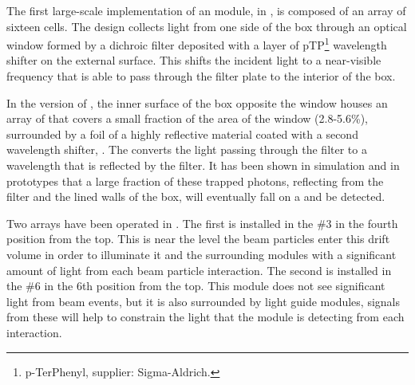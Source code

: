 The first large-scale implementation of an  module, in , is composed of an array of sixteen cells.
The  design collects light from one side of the box through an optical window formed by a dichroic filter deposited with a layer of pTP\footnote{p-TerPhenyl, supplier: Sigma-Aldrich\textregistered.}
wavelength shifter on the external surface. This shifts the incident  light to a near-visible frequency that is able to pass through the filter plate to the interior of the box.  

In the  version of , the inner surface of the box opposite the window houses an array of  that covers a small fraction of the area of the window (2.8-5.6\%), surrounded by a foil of a highly reflective material coated with a second wavelength shifter, . The  converts the light passing through the filter to a wavelength that is reflected by the filter. It has been shown in simulation and in prototypes that a large fraction of these trapped photons, reflecting from the filter and the lined walls of the box, will eventually fall on a  and be detected.

Two  arrays have been operated in . The first is installed in the  \#3 in the fourth position from the top.  This is near the level the beam particles enter this drift volume in order to illuminate it and the surrounding modules with a significant amount of light from each beam particle interaction.
The second is installed in the  \#6 in the 6th position from the top.  This module does not see significant light from beam events, but it is also surrounded by light guide modules, signals from these will help to constrain the light that the module is detecting from each interaction.

